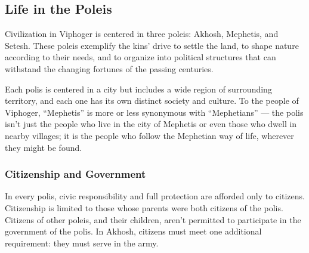 \subsection*{Life in the Poleis} \label{ssec::lifeinthepoleis}
Civilization in Viphoger is centered in three poleis: Akhosh, Mephetis, and Setesh.
These poleis exemplify the kins' drive to settle the land, to shape nature according to their needs, and to organize into political structures that can withstand the changing fortunes of the passing centuries.

Each polis is centered in a city but includes a wide region of surrounding territory, and each one has its own distinct society and culture.
To the people of Viphoger, ``Mephetis'' is more or less synonymous with ``Mephetians'' --- the polis isn't just the people who live in the city of Mephetis or even those who dwell in nearby villages; it is the people who follow the Mephetian way of life, wherever they might be found.

\thispagestyle{empty} %

\subsubsection{Citizenship and Government}
In every polis, civic responsibility and full protection are afforded only to citizens.
Citizenship is limited to those whose parents were both citizens of the polis.
Citizens of other poleis, and their children, aren't permitted to participate in the government of the polis.
In Akhosh, citizens must meet one additional requirement: they must serve in the army.

